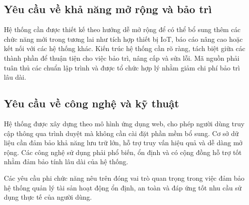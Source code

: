 \documentclass[../DoAn.tex]{subfiles}
\begin{document}
\subsection{Yêu cầu về khả năng mở rộng và bảo trì}

Hệ thống cần được thiết kế theo hướng dễ mở rộng để có thể bổ sung thêm các chức năng mới trong tương lai như tích hợp thiết bị IoT, báo cáo nâng cao hoặc kết nối với các hệ thống khác. Kiến trúc hệ thống cần rõ ràng, tách biệt giữa các thành phần để thuận tiện cho việc bảo trì, nâng cấp và sửa lỗi. Mã nguồn phải tuân thủ các chuẩn lập trình và được tổ chức hợp lý nhằm giảm chi phí bảo trì lâu dài.

\subsection{Yêu cầu về công nghệ và kỹ thuật}

Hệ thống được xây dựng theo mô hình ứng dụng web, cho phép người dùng truy cập thông qua trình duyệt mà không cần cài đặt phần mềm bổ sung. Cơ sở dữ liệu cần đảm bảo khả năng lưu trữ lớn, hỗ trợ truy vấn hiệu quả và dễ dàng mở rộng. Các công nghệ sử dụng phải phổ biến, ổn định và có cộng đồng hỗ trợ tốt nhằm đảm bảo tính lâu dài của hệ thống.

Các yêu cầu phi chức năng nêu trên đóng vai trò quan trọng trong việc đảm bảo hệ thống quản lý tài sản hoạt động ổn định, an toàn và đáp ứng tốt nhu cầu sử dụng thực tế của người dùng.



\end{document}
